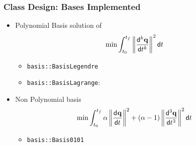 \begin{frame}[fragile]
	\frametitle{Class Design: Bases Implemented}
	\begin{itemize}
		\item Polynomial Basis solution of
		      \begin{eqnarray}
			      \min \int_{t_0}^{t_f} \left\|\frac{\mathsf{d}^{k} \mathbf{q}}{\mathsf{d} t^{k}}\right\|^2 \mathsf{d} t
		      \end{eqnarray}
		      \begin{itemize}
			      \item  \Verb|basis::BasisLegendre|
			      \item  \Verb|basis::BasisLagrange|: \\
			             
		      \end{itemize}
		\item Non Polynomial basis
		      \begin{eqnarray}
			      \min \int_{t_0}^{t_f} \alpha \left\|\frac{\mathsf{d}^{} \mathbf{q}}{\mathsf{d} t^{}}\right\|^2  + (\alpha - 1 )\left\|\frac{\mathsf{d}^{3} \mathbf{q}}{\mathsf{d} t^{3}}\right\|^2 \mathsf{d} t
		      \end{eqnarray}
		      \begin{itemize}
			      \item  \Verb|basis::Basis0101|
		      \end{itemize}
	\end{itemize}
\end{frame}

